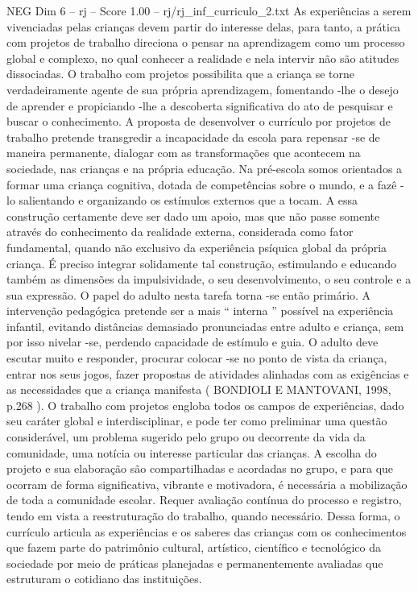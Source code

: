 \begin{textsample}{NEG Dim 6 – rj – Score 1.00 – rj/rj\_inf\_curriculo\_2.txt}  \label{ex:f6_neg_014}
As experiências a serem vivenciadas pelas crianças devem partir do interesse delas, para tanto, a prática com projetos de trabalho direciona o pensar na aprendizagem como um processo global e complexo, no qual conhecer a realidade e nela intervir não são atitudes dissociadas.
O trabalho com projetos possibilita que a criança se torne verdadeiramente agente de sua própria aprendizagem, fomentando -lhe o desejo de aprender e propiciando -lhe a descoberta significativa do ato de pesquisar e buscar o conhecimento.
A proposta de desenvolver o currículo por projetos de trabalho pretende transgredir a incapacidade da escola para repensar -se de maneira permanente, dialogar com as transformações que acontecem na sociedade, nas crianças e na própria educação.
Na pré-escola somos orientados a formar uma criança cognitiva, dotada de competências sobre o mundo, e a fazê -lo salientando e organizando os estímulos externos que a tocam.
A essa construção certamente deve ser dado um apoio, mas que não passe somente através do conhecimento da realidade externa, considerada como fator fundamental, quando não exclusivo da experiência psíquica global da própria criança.
É preciso integrar solidamente tal construção, estimulando e educando também as dimensões da impulsividade, o seu desenvolvimento, o seu controle e a sua expressão.
O papel do adulto nesta tarefa torna -se então primário.
A intervenção pedagógica pretende ser a mais “ interna ” possível na experiência infantil, evitando distâncias demasiado pronunciadas entre adulto e criança, sem por isso nivelar -se, perdendo capacidade de estímulo e guia.
O adulto deve escutar muito e responder, procurar colocar -se no ponto de vista da criança, entrar nos seus jogos, fazer propostas de atividades alinhadas com as exigências e as necessidades que a criança manifesta ( BONDIOLI E MANTOVANI, 1998, p.268 ).
O trabalho com projetos engloba todos os campos de experiências, dado seu caráter global e interdisciplinar, e pode ter como preliminar uma questão considerável, um problema sugerido pelo grupo ou decorrente da vida da comunidade, uma notícia ou interesse particular das crianças.
A escolha do projeto e sua elaboração são compartilhadas e acordadas no grupo, e para que ocorram de forma significativa, vibrante e motivadora, é necessária a mobilização de toda a comunidade escolar.
Requer avaliação contínua do processo e registro, tendo em vista a reestruturação do trabalho, quando necessário.
Dessa forma, o currículo articula as experiências e os saberes das crianças com os conhecimentos que fazem parte do patrimônio cultural, artístico, científico e tecnológico da sociedade por meio de práticas planejadas e permanentemente avaliadas que estruturam o cotidiano das instituições.

\end{textsample}
